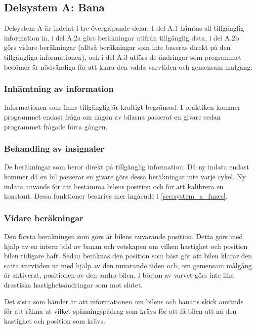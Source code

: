   \subsection{Delsystem A: Bana}
  
  Delsystem A är indelat i tre övergripande delar. I del A.1 hämtas all
  tillgänglig information in, i del A.2a görs beräkningar utifrån tillgänglig
  data, i del A.2b görs vidare beräkningar (alltså beräkningar som inte baseras
  direkt på den tillgängliga informationen), och i del A.3 utförs de ändringar
  som programmet bedömer är nödvändiga för att klara den valda varvtiden och gemensam målgång. 

    \subsubsection{Inhämtning av information}

    Informationen som finns tillgänglig är kraftigt begränsad. I praktiken kommer
    programmet endast fråga om någon av bilarna passerat en givare sedan
    programmet frågade förra gången.

    \subsubsection{Behandling av insignaler}

    De beräkningar som beror direkt på tillgänglig
    information. Då ny indata endast kommer då en bil passerar en givare görs dessa beräkningar inte varje cykel. 
 Ny indata används för att bestämma bilens position och för att kalibrera en konstant. Dessa funktioner beskrivs 
mer ingående i \ref{sec:system_a_funcs}.

    \subsubsection{Vidare beräkningar}
    
    Den första beräkningen som görs är bilens nuvarande position. Detta görs med
    hjälp av en intern bild av banan och vetskapen om vilken hastighet och position bilen
    tidigare haft. Sedan beräknas den position som bäst gör att bilen klarar den satta
    varvtiden ut med hjälp av den nuvarande tiden och, om gemensam målgång är aktiverat, positionen av den andra bilen.  
    I början av varvet görs inte lika drastiska hastighetsändringar som mot slutet.

    Det sista som händer är att informationen om bilens och banans skick används
    för att räkna ut vilket spänningspådrag som krävs för att få bilen att nå
    den hastighet och position som krävs.

